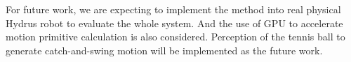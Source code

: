 \documentclass{jarticle}
\begin{document}
For future work, we are expecting to implement the method into real physical Hydrus robot to evaluate the whole system. And the use of GPU to accelerate motion primitive calculation is also considered. Perception of the tennis ball to generate catch-and-swing motion will be implemented as the future work.

{\footnotesize


}
\end{document}
